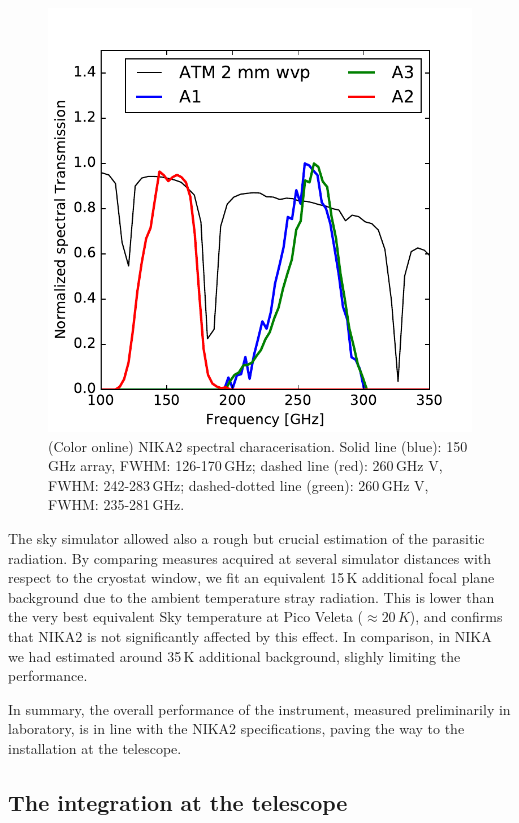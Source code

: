 \documentclass[]{aa} %
\begin{document}
\begin{figure}[h]
   \centering
    \includegraphics[width=1.0\linewidth]{atm_transmission.pdf}
      \caption{(Color online) NIKA2 spectral characerisation. Solid line (blue): 150\,GHz array, FWHM: 126-170\,GHz; dashed line (red): 260\,GHz V, FWHM: 242-283\,GHz; dashed-dotted line (green): 260\,GHz V, FWHM: 235-281\,GHz.}
         \label{Fig4}
\end{figure}

The sky simulator allowed also a rough but crucial estimation of the parasitic radiation. By comparing measures acquired at several simulator distances with respect to the cryostat window, we fit an equivalent 15\,K additional focal plane background due to the ambient temperature stray radiation. This is lower than the very best equivalent Sky temperature at Pico Veleta ($\approx 20\,K$), and confirms that NIKA2 is not significantly affected by this effect. In comparison, in NIKA we had estimated around 35\,K additional background, slighly limiting the performance. 

In summary, the overall performance of the instrument, measured preliminarily in laboratory, is in line with the NIKA2 specifications, paving the way to the installation at the telescope. 

\subsection{The integration at the telescope}
\label{The integration at the telescope}
\end{document}
